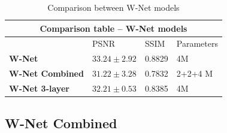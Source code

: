 \vspace*{0.3cm}
\begin{table}[h]
\begin{center}
\begin{tabular}{ p{4cm} m{3cm} m{3cm} m{3cm} }
 \hline
 \multicolumn{4}{c}{Comparison table -- W-Net models} \\
 \hline
 & PSNR & SSIM & Parameters \\
 \hline
 \hline
 \textbf{W-Net}    & $33.24 \pm 2.92$ & 0.8829 & 4M\\
 \hline
 \textbf{W-Net Combined}& $31.22 \pm 3.28 $& 0.7832 & 2+2+4 M\\
 \textbf{W-Net 3-layer}& $32.21 \pm 0.53$  & 0.8385 & 4M\\
 \hline
\end{tabular}
\end{center}
\caption{Comparison between W-Net models}
\label{W-Net table}
\end{table}

\subsection{W-Net Combined}


